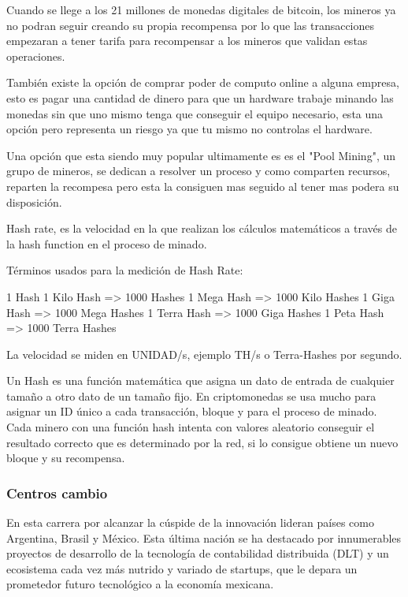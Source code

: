 \documentclass[12pt,letterpaper]{article}
\begin{document}
Cuando se llege a los 21 millones de monedas digitales de bitcoin, los mineros ya no podran seguir creando su propia recompensa por lo que las transacciones empezaran a tener tarifa para recompensar a los mineros que validan estas operaciones.

	Tambi\'en existe la opci\'on de comprar poder de computo online a alguna empresa, esto es pagar una cantidad de dinero para que un hardware trabaje minando las monedas sin que uno mismo tenga que conseguir el equipo necesario, esta una opci\'on pero representa un riesgo ya que tu mismo no controlas el hardware.
	
	Una opci\'on que esta siendo muy popular ultimamente es es el "Pool Mining", un grupo de mineros, se dedican a resolver un proceso y como comparten recursos, reparten la recompesa pero esta la consiguen mas seguido al tener mas podera su disposici\'on.

Hash rate, es la velocidad en la que realizan los cálculos matemáticos a través de la hash function en el proceso de minado.

Términos usados para la medición de Hash Rate:

    1 Hash
    1 Kilo Hash => 1000 Hashes
    1 Mega Hash => 1000 Kilo Hashes
    1 Giga Hash => 1000 Mega Hashes
    1 Terra Hash => 1000 Giga Hashes
    1 Peta Hash => 1000 Terra Hashes

La velocidad se miden en UNIDAD/s, ejemplo TH/s o Terra-Hashes por segundo.	

Un Hash es una función matemática que asigna un dato de entrada de cualquier tamaño a otro dato de un tamaño fijo. En criptomonedas se usa mucho para asignar un ID único a cada transacción, bloque y para el proceso de minado. Cada minero con una función hash intenta con valores aleatorio conseguir el resultado correcto que es determinado por la red, si lo consigue obtiene un nuevo bloque y su recompensa.


		\subsubsection*{Centros cambio}

En esta carrera por alcanzar la c\'uspide de la innovaci\'on lideran pa\'ises como Argentina, Brasil y M\'exico. Esta \'ultima naci\'on se ha destacado por innumerables proyectos de desarrollo de la tecnolog\'ia de contabilidad distribuida (DLT) y un ecosistema cada vez m\'as nutrido y variado de startups, que le depara un prometedor futuro tecnol\'ogico a la econom\'ia mexicana.		
\end{document}
